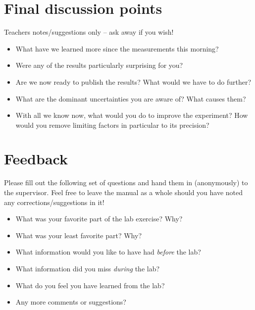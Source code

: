 \documentclass[a4,11pt, notitlepage]{article}
\begin{document}
\appendix

\section{Final discussion points}
\label{sec:further-discussion}

Teachers notes/suggestions only -- ask away if you wish!

\begin{itemize}
\item What have we learned more since the measurements this morning?
\item Were any of the results particularly surprising for you?
\item Are we now ready to publish the results? What would we have to
  do further?
\item What are the dominant uncertainties you are aware of? What causes them?
\item With all we know now, what would you do to improve the
  experiment? How would you remove limiting factors in particular to its precision?
\end{itemize}

\pagebreak
\section{Feedback}
\label{sec:feedback}

Please fill out the following set of questions and hand them in
(anonymously) to the supervisor. Feel free to leave the manual as a
whole should you have noted any corrections/suggestions in it!

\begin{itemize}
\item What was your favorite part of the lab exercise? Why?
\vspace{3cm}

\item What was your least favorite part? Why?
\vspace{3cm}

\item What information would you like to have had \emph{before} the lab?
\vspace{3cm}

\item What information did you miss \emph{during} the lab?
\vspace{3cm}

\item What do you feel you have learned from the lab?
\vspace{3cm}

\item Any more comments or suggestions?
\vspace{5cm}

\end{itemize}
\end{document}
